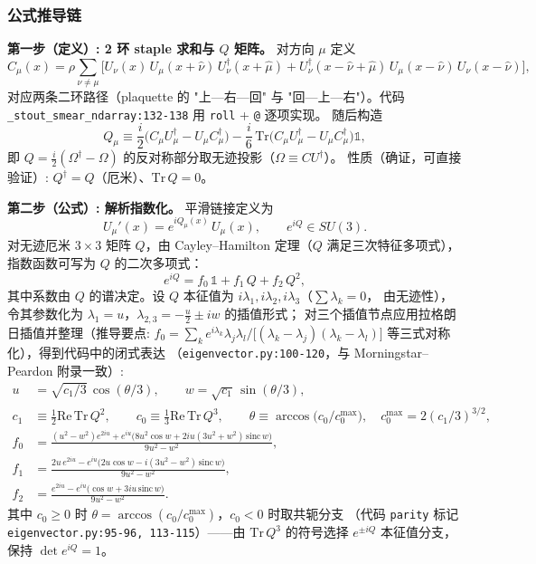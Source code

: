 \documentclass[UTF8]{ctexart}
\begin{document}
\subsubsection{公式推导链}
\textbf{第一步（定义）: 2 环 staple 求和与 $Q$ 矩阵。} 对方向 $\mu$ 定义
\begin{equation}\label{eq:stoutC}
C_\mu(x) = \rho \sum_{\nu\neq\mu}\Big[
U_\nu(x)\,U_\mu(x+\hat\nu)\,U_\nu^\dagger(x+\hat\mu)
+ U_\nu^\dagger(x-\hat\nu+\hat\mu)\,U_\mu(x-\hat\nu)\,U_\nu(x-\hat\nu)\Big],
\end{equation}
对应两条二环路径（plaquette 的 "上—右—回" 与 "回—上—右"）。代码
\texttt{\nolinkurl{_stout_smear_ndarray:132-138}} 用 \texttt{roll} + \texttt{@} 逐项实现。
随后构造
\begin{equation}\label{eq:stoutQ}
Q_\mu \equiv \frac{i}{2}\Big(C_\mu U_\mu^\dagger - U_\mu C_\mu^\dagger\Big) - \frac{i}{6}\,\mathrm{Tr}\Big(C_\mu U_\mu^\dagger - U_\mu C_\mu^\dagger\Big)\mathbb{1},
\end{equation}
即 $Q = \tfrac{i}{2}(\Omega^\dagger - \Omega)$ 的反对称部分取无迹投影（$\Omega \equiv C U^\dagger$）。
性质（确证，可直接验证）: $Q^\dagger = Q$（厄米）、$\mathrm{Tr}\,Q = 0$。

\textbf{第二步（公式）: 解析指数化。} 平滑链接定义为
\begin{equation}\label{eq:stoutU}
U_\mu'(x) = e^{iQ_\mu(x)}\, U_\mu(x),\qquad e^{iQ} \in SU(3).
\end{equation}
对无迹厄米 $3\times3$ 矩阵 $Q$，由 Cayley--Hamilton 定理（$Q$ 满足三次特征多项式），指数函数可写为
$Q$ 的二次多项式：
\begin{equation}\label{eq:exp3}
e^{iQ} = f_0\,\mathbb{1} + f_1\,Q + f_2\,Q^2,
\end{equation}
其中系数由 $Q$ 的谱决定。设 $Q$ 本征值为 $i\lambda_1, i\lambda_2, i\lambda_3$（$\sum\lambda_k = 0$，
由无迹性），令其参数化为 $\lambda_1 = u$，$\lambda_{2,3} = -\tfrac{u}{2} \pm iw$ 的插值形式；
对三个插值节点应用拉格朗日插值并整理（推导要点: $f_0 = \sum_k e^{i\lambda_k}\lambda_j\lambda_l /
\big[(\lambda_k-\lambda_j)(\lambda_k-\lambda_l)\big]$ 等三式对称化），得到代码中的闭式表达
（\texttt{eigenvector.py:100-120}，与 Morningstar--Peardon 附录一致）:
\begin{align}
u &= \sqrt{c_1/3}\,\cos(\theta/3),\qquad w = \sqrt{c_1}\,\sin(\theta/3),\label{eq:u_w}\\
c_1 &\equiv \tfrac12\mathrm{Re}\,\mathrm{Tr}\,Q^2,\qquad
c_0 \equiv \tfrac13\mathrm{Re}\,\mathrm{Tr}\,Q^3,\qquad
\theta \equiv \arccos\!\big(c_0 / c_0^{\max}\big),\quad
c_0^{\max} = 2(c_1/3)^{3/2},\label{eq:c0c1}\\
f_0 &= \frac{(u^2-w^2)e^{2iu} + e^{iu}\big(8u^2\cos w + 2iu(3u^2+w^2)\,\mathrm{sinc}\,w\big)}{9u^2-w^2},\label{eq:f0}\\
f_1 &= \frac{2u\,e^{2iu} - e^{iu}\big(2u\cos w - i(3u^2-w^2)\,\mathrm{sinc}\,w\big)}{9u^2-w^2},\label{eq:f1}\\
f_2 &= \frac{e^{2iu} - e^{iu}\big(\cos w + 3iu\,\mathrm{sinc}\,w\big)}{9u^2-w^2}.\label{eq:f2}
\end{align}
其中 $c_0 \ge 0$ 时 $\theta = \arccos(c_0/c_0^{\max})$，$c_0<0$ 时取共轭分支
（代码 \texttt{parity} 标记 \texttt{eigenvector.py:95-96, 113-115}）——由
$\mathrm{Tr}\,Q^3$ 的符号选择 $e^{\pm iQ}$ 本征值分支，保持 $\det e^{iQ}=1$。
\end{document}
